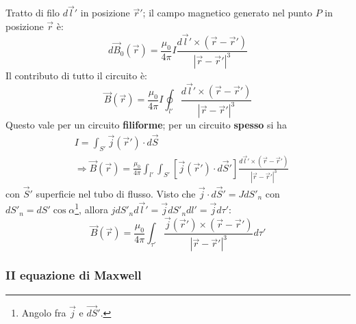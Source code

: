 \documentclass[10pt, a4paper]{scrartcl}
\numberwithin{equation}{subsection}
\theoremstyle{style1}
\begin{document}
Tratto di filo $d\vec{l}'$ in posizione $\vec{r}'$; il campo magnetico generato nel punto $P$ in posizione $\vec{r}$ \`e:
\begin{equation}
	d\vec{B}_0 (\vec{r})= \frac{\mu_0}{4 \pi} I \frac{d\vec{l}' \times (\vec{r}-\vec{r}')}{\left\lvert \vec{r}-\vec{r}' \right\rvert ^3}
\end{equation}
Il contributo di tutto il circuito \`e:
\begin{equation}
	\vec{B} (\vec{r}) = \frac{\mu_0}{4\pi}I \oint_{l'} \frac{d\vec{l}' \times (\vec{r}-\vec{r}')}{\left\lvert \vec{r}-\vec{r}' \right\rvert^3 }
\end{equation}
Questo vale per un circuito \textbf{filiforme}; per un circuito \textbf{spesso} si ha
\begin{equation}
	\begin{split}
		&I = \int_{S'}\vec{j}(\vec{r}') \cdot d\vec{S}\\
		&\Rightarrow\vec{B}(\vec{r}) = \frac{\mu _0}{4 \pi }\int_{l'} \int_{S'} \left[ \vec{j}(\vec{r}')\cdot d\vec{S}' \right] \frac{d\vec{l}'\times (\vec{r}-\vec{r}')}{\left\lvert \vec{r}-\vec{r}' \right\rvert ^3}
	\end{split}
\end{equation}
con $\vec{S}'$ superficie nel tubo di flusso. Visto che $\vec{j}\cdot d\vec{S}' = JdS'_n$ con $dS'_n = dS' \cos \alpha $\footnote{Angolo fra $\vec{j}$ e $\vec{dS}'$.}, allora $jdS'_n d\vec{l}' = \vec{j}dS'_n dl' = \vec{j}d\tau '$:
\begin{equation}
	\vec{B}(\vec{r}) = \frac{\mu _0}{4\pi} \int_{\tau '} \frac{\vec{j}(\vec{r}') \times (\vec{r}-\vec{r}')}{\left\lvert \vec{r}-\vec{r}' \right\rvert^3 }d\tau '
\end{equation}
\subsubsection{II equazione di Maxwell}
\end{document}
